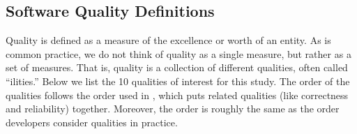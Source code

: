 \documentclass[11pt]{article}
\begin{document}
\subsection{Software Quality Definitions} \label{sec_software_quality}

Quality is defined as a measure of the excellence or worth of an entity.  As is
common practice, we do not think of quality as a single measure, but rather as a
set of measures.  That is, quality is a collection of different qualities, often
called ``ilities.''  Below we list the 10 qualities of interest for this study.
The order of the qualities follows the order used in \citet{GhezziEtAl2003},
which puts related qualities (like correctness and reliability) together.
Moreover, the order is roughly the same as the order developers consider
qualities in practice.
\end{document}
